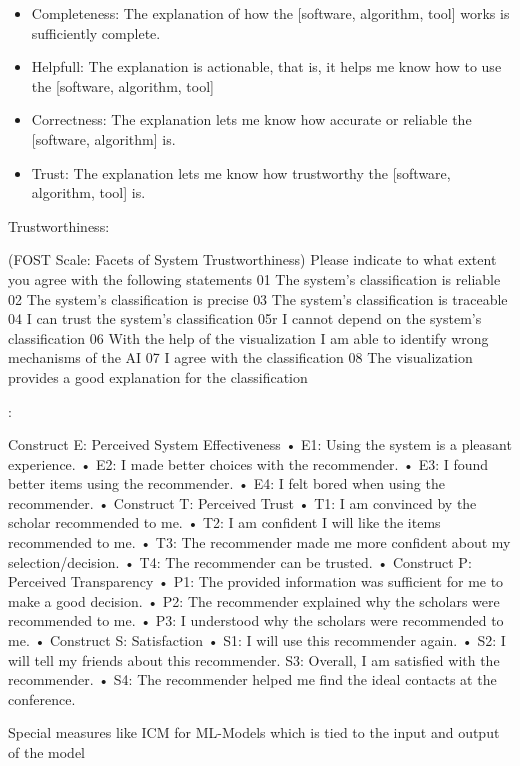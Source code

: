 \begin{itemize}
 \item Completeness: The explanation of how the [software, algorithm, tool] works is sufficiently complete. \cite{hoffman_metrics_nodate}
 \item Helpfull: The explanation is actionable, that is, it helps me know how to use the [software, algorithm, tool] \cite{hoffman_metrics_nodate}
 \item Correctness: The explanation lets me know how accurate or reliable the [software, algorithm] is.\cite{hoffman_metrics_nodate}
 \item Trust: The explanation lets me know how trustworthy the [software, algorithm, tool] is. \cite{hoffman_metrics_nodate}
\end{itemize}

Trustworthiness: \cite{schrills_color_2020}

(FOST Scale: Facets of System Trustworthiness)
Please indicate to what extent you agree with the following statements 01 The system’s classification is reliable 02 The system’s classification is precise 03 The system’s classification is traceable 04 I can trust the system’s classification 05r I cannot depend on the system’s classification 06 With the help of the visualization I am able to identify wrong mechanisms of the AI 07 I agree with the classification 08 The visualization provides a good explanation for the classification


\cite{tsai_effects_2020}:

Construct E: Perceived System Effectiveness • E1: Using the system is a pleasant experience. • E2: I made better choices with the recommender. • E3: I found better items using the recommender. • E4: I felt bored when using the recommender. • Construct T: Perceived Trust • T1: I am convinced by the scholar recommended to me. • T2: I am confident I will like the items recommended to me. • T3: The recommender made me more confident about my selection/decision. • T4: The recommender can be trusted. • Construct P: Perceived Transparency • P1: The provided information was sufficient for me to make a good decision. • P2: The recommender explained why the scholars were recommended to me. • P3: I understood why the scholars were recommended to me. • Construct S: Satisfaction • S1: I will use this recommender again. • S2: I will tell my friends about this recommender. S3: Overall, I am satisfied with the recommender. • S4: The recommender helped me find the ideal contacts at the conference.

Special measures like ICM for ML-Models which is tied to the input and output of the model \cite{waa_evaluating_2021, neerincx_using_2018}

